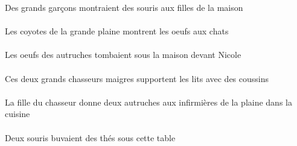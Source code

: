 \begin{exe}
Des grands garçons montraient des souris aux filles de la maison
\ex\gll
\DEFPlErg{}    \DEFSgObl{}   \grandCSg{}   \plaineCSgObl{}   \DE{}   \coyoteAPlErg{}    \DEFPlDat{}   \chatDPlDat{}   \DEFPlAbs{}   \oeufDPlAbs{}  \montrerVdPrsDPl{}\\
\DEFPlErgP{}    \DEFSgOblP{}   \grandCSgP{}   \plaineCSgOblP{}   \DEP{}   \coyoteAPlErgP{}    \DEFPlDatP{}   \chatDPlDatP{}   \DEFPlAbsP{}   \oeufDPlAbsP{}  \montrerVdPrsDPlP{}\\
Les coyotes de la grande plaine montrent les oeufs aux chats
\ex\gll
\INDSgObl{}   \NicoleDSgObl{}   \DEVANT{}   \DEFPlAbs{}    \DEFPlObl{}   \autrucheDPlObl{}   \DE{}   \oeufDPlAbs{}    \DEFSgObl{}   \maisonDSgObl{}   \SOUS{}  \tomberViPstDPl{}\\
\INDSgOblP{}   \NicoleDSgOblP{}   \DEVANTP{}   \DEFPlAbsP{}    \DEFPlOblP{}   \autrucheDPlOblP{}   \DEP{}   \oeufDPlAbsP{}    \DEFSgOblP{}   \maisonDSgOblP{}   \SOUSP{}  \tomberViPstDPlP{}\\
Les oeufs des autruches tombaient sous la maison devant Nicole
\ex\gll
\DEMDuErg{}   \grandCDu{}   \maigreCDu{}   \chasseurCDuErg{}    \INDPlObl{}   \coussinAPlObl{}   \AVEC{}   \DEFPlAbs{}   \litDPlAbs{}  \supporterVtPrsDPl{}\\
\DEMDuErgP{}   \grandCDuP{}   \maigreCDuP{}   \chasseurCDuErgP{}    \INDPlOblP{}   \coussinAPlOblP{}   \AVECP{}   \DEFPlAbsP{}   \litDPlAbsP{}  \supporterVtPrsDPlP{}\\
Ces deux grands chasseurs maigres supportent les lits avec des coussins
\ex\gll
\DEFSgObl{}   \cuisineCSgObl{}   \DANS{}   \DEFSgErg{}    \DEFSgObl{}   \chasseurCSgObl{}   \DE{}   \filleCSgErg{}    \DEFPlDat{}    \DEFSgObl{}   \plaineCSgObl{}   \DE{}   \infirmiereBPlDat{}   \INDDuAbs{}   \autrucheDDuAbs{}  \donnerVdPrsDDu{}\\
\DEFSgOblP{}   \cuisineCSgOblP{}   \DANSP{}   \DEFSgErgP{}    \DEFSgOblP{}   \chasseurCSgOblP{}   \DEP{}   \filleCSgErgP{}    \DEFPlDatP{}    \DEFSgOblP{}   \plaineCSgOblP{}   \DEP{}   \infirmiereBPlDatP{}   \INDDuAbsP{}   \autrucheDDuAbsP{}  \donnerVdPrsDDuP{}\\
La fille du chasseur donne deux autruches aux infirmières de la plaine dans la cuisine
\ex\gll
\DEMSgObl{}   \tableCSgObl{}   \SOUS{}   \INDDuErg{}   \sourisADuErg{}   \INDPlAbs{}   \theBPlAbs{}  \boireVtPstBPl{}\\
\DEMSgOblP{}   \tableCSgOblP{}   \SOUSP{}   \INDDuErgP{}   \sourisADuErgP{}   \INDPlAbsP{}   \theBPlAbsP{}  \boireVtPstBPlP{}\\
Deux souris buvaient des thés sous cette table

\end{exe}

